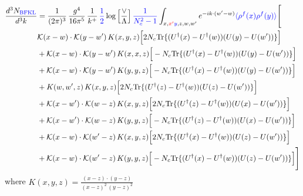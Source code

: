 \documentclass[9pt]{article}
\numberwithin{equation}{section}
\newcommand{\new}[1]{{\color{blue}#1}}
\newcommand{\old}[1]{{\color{red}#1}}
\begin{document}
\begin{align}
\frac{d^{3}N_{\new{\mathrm{BFKL}}}}{d^{3}k} & = \frac{1}{(2\pi)^{3}}\,\frac{g^{4}}{16\pi^{5}}\,\frac{1}{k^{+}}\,\new{\frac{1}{2}}\log\Big[\frac{\vee}{\Lambda}\Big]\,\new{\frac{1}{N_c^2-1}}\int_{x,\old{x'}\new{y},z,w,w'}e^{-ik\cdot(w'-w)}\new{\langle\rho^f(x)\rho^f(y)\rangle}\Bigg[ \notag\\ & \mathcal K(x-w)\cdot\mathcal K(y-w')\,K(x,y,z)\Big[2 N_{c}{\rm Tr}\{(U^\dagger(x)-U^\dagger(w))(U(y)-U(w'))\}\Big]\notag\\
&+\mathcal K(x-w)\cdot\mathcal K(y-w')\,K(x,x,z)\Big[-N_{c}{\rm Tr}\{(U^\dagger(x)-U^\dagger(w))(U(y)-U(w'))\}\Big]\notag\\
&+\mathcal K(x-w)\cdot\mathcal K(y-w')\,K(y,y,z)\Big[-N_{c}{\rm Tr}\{(U^\dagger(x)-U^\dagger(w))(U(y)-U(w'))\}\Big]\notag\\
&+K(w,w',z)\,K(x,y,z)\Big[2 N_{c}{\rm Tr}\{(U^\dagger(z)-U^\dagger(w))(U(z)-U(w'))\}\Big]\notag\\
&+\mathcal K(x-w')\cdot\mathcal K(w-z)\,K(x,y,z)\Big[2 N_{c}{\rm Tr}\{(U^\dagger(z)-U^\dagger(w))(U(x)-U(w'))\}\Big]\notag\\
&+\mathcal K(x-w')\cdot\mathcal K(w-z)\,K(y,y,z)\Big[-N_{c}{\rm Tr}\{(U^\dagger(z)-U^\dagger(w))(U(x)-U(w'))\}\Big]\notag\\
&+\mathcal K(x-w)\cdot\mathcal K(w'-z)\,K(x,y,z)\Big[2 N_{c}{\rm Tr}\{(U^\dagger(x)-U^\dagger(w))(U(z)-U(w'))\}\Big]\notag\\
&+\mathcal K(x-w)\cdot\mathcal K(w'-z)\,K(y,y,z)\Big[-N_{c}{\rm Tr}\{(U^\dagger(x)-U^\dagger(w))(U(z)-U(w'))\}\Big]\Bigg]
\end{align}
where $K(x,y,z) = \frac{(x-z)\cdot (y-z)}{(x-z)^{2}\, (y-z)^{2}}$
\end{document}
